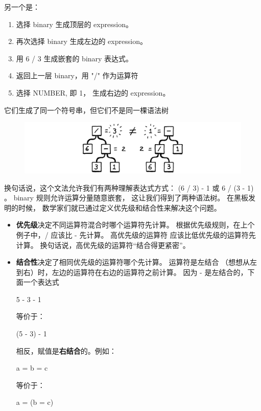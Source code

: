 \documentclass[cn,10pt,math=newtx,citestyle=gb7714-2015,bibstyle=gb7714-2015]{elegantbook}
\begin{document}
另一个是：

\begin{enumerate}
  \item 选择 binary 生成顶层的 expression。
  \item 再次选择 binary 生成左边的 expression。
  \item 用 6 / 3 生成嵌套的 binary 表达式。
  \item 返回上一层 binary，用 "/" 作为运算符
  \item 选择 NUMBER, 即 1， 生成右边的 expression。
\end{enumerate}

它们生成了同一个符号串，但它们不是同一棵语法树

\begin{figure}[h]
\centering
\includegraphics[width=\textwidth]{image/parsing-expressions/syntax-trees.png}
\end{figure}

换句话说，这个文法允许我们有两种理解表达式方式： (6 / 3) - 1 或 6 / (3 - 1) 。 binary 规则允许运算分量随意嵌套， 这让我们得到了两种语法树。 在黑板发明的时候， 数学家们就已通过定义优先级和结合性来解决这个问题。

\begin{itemize}
  \item \textbf{优先级}决定不同运算符混合时哪个运算符先计算。 根据优先级规则，在上个例子中，/ 应该比 - 先计算。 高优先级的运算符 应该比低优先级的运算符先计算。 换句话说，高优先级的运算符“结合得更紧密”。
  \item \textbf{结合性}决定了相同优先级的运算符哪个先计算。 运算符是左结合 （想想从左到右）时，左边的运算符在右边的运算符之前计算。 因为 - 是左结合的，下面一个表达式
  \begin{tcolorbox}
    5 - 3 - 1
  \end{tcolorbox}
  等价于：
  \begin{tcolorbox}
    (5 - 3) - 1
  \end{tcolorbox}
  相反，赋值是\textbf{右结合}的。例如：
  \begin{tcolorbox}
    a = b = c
  \end{tcolorbox}
  等价于：
  \begin{tcolorbox}
    a = (b = c)
  \end{tcolorbox}
\end{itemize}
\end{document}
